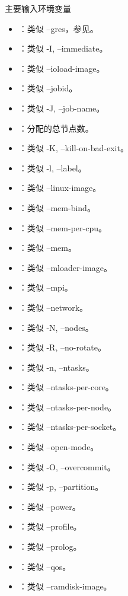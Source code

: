 \begin{frame}{主要输入环境变量}
\begin{itemize}
	\item {}：类似 --gres，参见。
	\item {}：类似 -I, --immediate。
	\item {}：类似 --ioload-image。
	\item {}：类似 --jobid。
	\item {}：类似 -J, --job-name。
	\item {}：分配的总节点数。
	\item {}：类似 -K, --kill-on-bad-exit。
	\item {}：类似 -l, --label。
	\item {}：类似 --linux-image。
	\item {}：类似 --mem-bind。
	\item {}：类似 --mem-per-cpu。
	\item {}：类似 --mem。
	\item {}：类似 --mloader-image。
	\item {}：类似 --mpi。
	\item {}：类似 --network。
	\item {}：类似 -N, --nodes。
	\item {}：类似 -R, --no-rotate。
	\item {}：类似 -n, --ntasks。
	\item {}：类似 --ntasks-per-core。
	\item {}：类似 --ntasks-per-node。
	\item {}：类似 --ntasks-per-socket。
	\item {}：类似 --open-mode。
	\item {}：类似 -O, --overcommit。
	\item {}：类似 -p, --partition。
	\item {}：类似 --power。
	\item {}：类似 --profile。
	\item {}：类似 --prolog。
	\item {}：类似 --qos。
	\item {}：类似 --ramdisk-image。

\end{itemize}
\end{frame}
